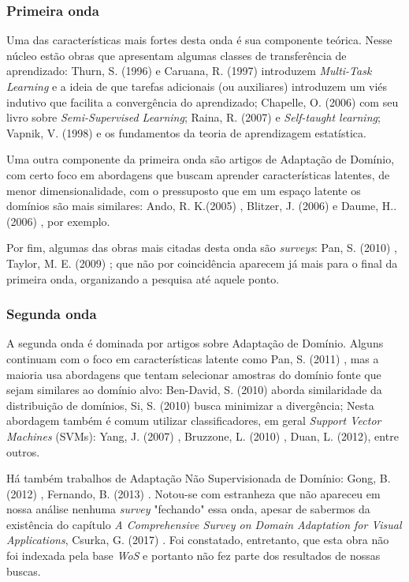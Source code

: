 \documentclass[sigconf]{acmart}
\begin{document}
\subsubsection{Primeira onda}
Uma das características mais fortes desta onda é sua componente teórica. Nesse núcleo estão obras que apresentam algumas classes de transferência de aprendizado: Thurn, S. (1996) \cite{thrun1996learning} e Caruana, R. (1997) \cite{Caruana1997} introduzem \emph{Multi-Task Learning} e a ideia de que tarefas adicionais (ou auxiliares) introduzem um viés indutivo que facilita a convergência do aprendizado; Chapelle, O. (2006) \cite{Chapelle:2010:SL:1841234} com seu livro sobre \emph{Semi-Supervised Learning}; Raina, R. (2007) e \emph{Self-taught learning}; Vapnik, V. (1998) \cite{Vapnik1998} e os fundamentos da teoria de aprendizagem estatística.

Uma outra componente da primeira onda são artigos de Adaptação de Domínio, com certo foco em abordagens que buscam aprender características latentes, de menor dimensionalidade, com o pressuposto que em um espaço latente os domínios são mais similares: Ando, R. K.(2005) \cite{ando2005framework}, Blitzer, J. (2006) \cite{Blitzer:2006:DAS:1610075.1610094} e Daume, H.. (2006) \cite{DaumeIII2006}, por exemplo. 

Por fim, algumas das obras mais citadas desta onda são \emph{surveys}: Pan, S. (2010) \cite{PanYang}, Taylor, M. E. (2009) \cite{Taylor:2009:TLR:1577069.1755839}; que não por coincidência aparecem já mais para o final da primeira onda, organizando a pesquisa até aquele ponto. 

\subsubsection{Segunda onda}
A segunda onda é dominada por artigos sobre Adaptação de Domínio.  Alguns continuam com o foco em características latente como Pan, S. (2011) \cite{Pan2011}, mas a maioria usa abordagens que tentam selecionar amostras do domínio fonte que sejam similares ao domínio alvo: Ben-David, S. (2010) \cite{BenDavid2009} aborda similaridade da distribuição de domínios, Si, S. (2010) \cite{SiSi2010} busca minimizar a divergência; Nesta abordagem também é comum utilizar classificadores, em geral \emph{Support Vector Machines} (SVMs): Yang, J. (2007) \cite{Yang2007}, Bruzzone, L. (2010) \cite{Bruzzone2010}, Duan, L. (2012)\cite{LixinDuan2012}, entre outros.

Há também trabalhos de Adaptação Não Supervisionada de Domínio: Gong, B. (2012) \cite{BoqingGong2012}, Fernando, B. (2013) \cite{Fernando2013}.
Notou-se com estranheza que não apareceu em nossa análise nenhuma \emph{survey} "fechando" essa onda, apesar de sabermos da existência do capítulo \emph{A Comprehensive Survey on Domain Adaptation for Visual Applications}, Csurka, G. (2017) \cite{Csurka2017}. Foi constatado, entretanto, que esta obra não foi indexada pela base \emph{WoS} e portanto não fez parte dos resultados de nossas buscas. 
\end{document}
